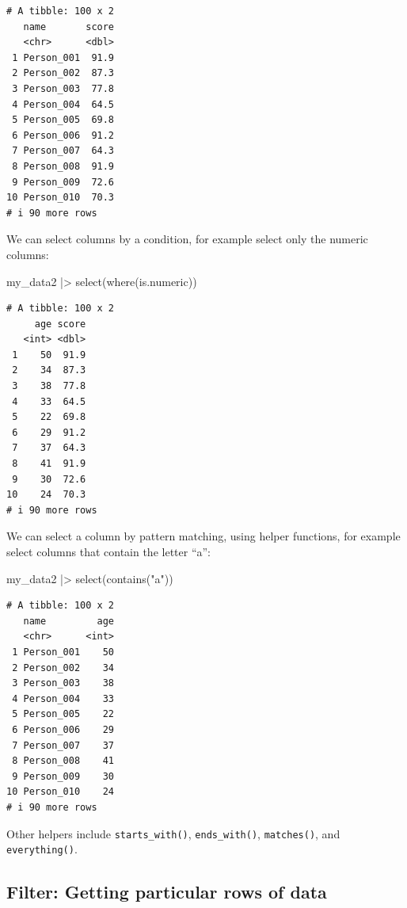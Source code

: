 \documentclass[
  letterpaper,
  8pt,
  a4paper]{book}
\newenvironment{Shaded}{\begin{snugshade}}{\end{snugshade}}
\newcommand{\FunctionTok}[1]{\textcolor[rgb]{0.28,0.35,0.67}{#1}}
\newcommand{\NormalTok}[1]{\textcolor[rgb]{0.00,0.23,0.31}{#1}}
\newcommand{\SpecialCharTok}[1]{\textcolor[rgb]{0.37,0.37,0.37}{#1}}
\newcommand{\StringTok}[1]{\textcolor[rgb]{0.13,0.47,0.30}{#1}}
\begin{document}
\begin{verbatim}
# A tibble: 100 x 2
   name       score
   <chr>      <dbl>
 1 Person_001  91.9
 2 Person_002  87.3
 3 Person_003  77.8
 4 Person_004  64.5
 5 Person_005  69.8
 6 Person_006  91.2
 7 Person_007  64.3
 8 Person_008  91.9
 9 Person_009  72.6
10 Person_010  70.3
# i 90 more rows
\end{verbatim}

We can select columns by a condition, for example select only the
numeric columns:

\begin{Shaded}
\begin{Highlighting}[]
\NormalTok{my\_data2 }\SpecialCharTok{|\textgreater{}} 
  \FunctionTok{select}\NormalTok{(}\FunctionTok{where}\NormalTok{(is.numeric))}
\end{Highlighting}
\end{Shaded}

\begin{verbatim}
# A tibble: 100 x 2
     age score
   <int> <dbl>
 1    50  91.9
 2    34  87.3
 3    38  77.8
 4    33  64.5
 5    22  69.8
 6    29  91.2
 7    37  64.3
 8    41  91.9
 9    30  72.6
10    24  70.3
# i 90 more rows
\end{verbatim}

We can select a column by pattern matching, using helper functions, for
example select columns that contain the letter ``a'':

\begin{Shaded}
\begin{Highlighting}[]
\NormalTok{my\_data2 }\SpecialCharTok{|\textgreater{}} 
  \FunctionTok{select}\NormalTok{(}\FunctionTok{contains}\NormalTok{(}\StringTok{"a"}\NormalTok{))}
\end{Highlighting}
\end{Shaded}

\begin{verbatim}
# A tibble: 100 x 2
   name         age
   <chr>      <int>
 1 Person_001    50
 2 Person_002    34
 3 Person_003    38
 4 Person_004    33
 5 Person_005    22
 6 Person_006    29
 7 Person_007    37
 8 Person_008    41
 9 Person_009    30
10 Person_010    24
# i 90 more rows
\end{verbatim}

Other helpers include \texttt{starts\_with()}, \texttt{ends\_with()},
\texttt{matches()}, and \texttt{everything()}.

\subsection*{Filter: Getting particular rows of
data}\label{filter-getting-particular-rows-of-data}
\end{document}
